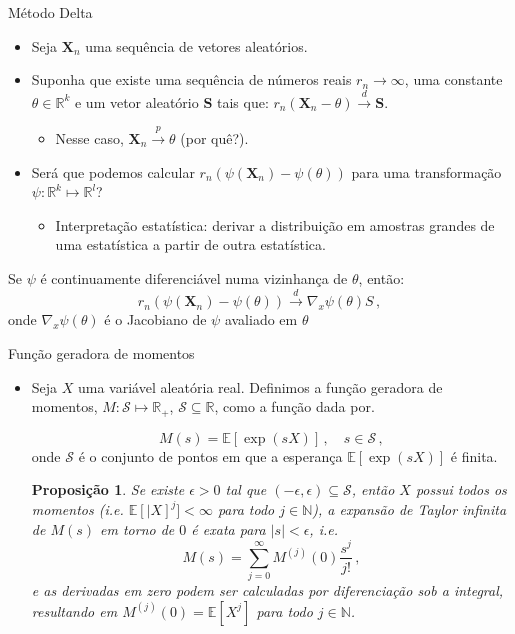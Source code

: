 \documentclass[11pt]{beamer}
\newtheorem{proposition}{Proposição}
\begin{document}
	\begin{frame}{Método Delta}

	\begin{itemize}
		\item Seja $\boldsymbol{X}_n$ uma sequência de vetores aleatórios. 
		\item Suponha que existe uma sequência de números reais $r_n \to \infty$, uma constante $\theta \in \mathbb{R}^k$ e um vetor aleatório $\boldsymbol{S}$ tais que: $r_n(\boldsymbol{X}_n-\theta) \overset{d}{\to}\boldsymbol{S}$.
		\begin{itemize}
			\item Nesse caso, $\boldsymbol{X}_n \overset{p}{\to} \theta$ (por quê?).
		\end{itemize}
		\item Será que podemos calcular $r_n(\psi(\boldsymbol{X}_n)-\psi(\theta))$ para uma transformação $\psi:\mathbb{R}^k \mapsto \mathbb{R}^l$?
		\begin{itemize}
			\item Interpretação estatística: derivar a distribuição em amostras grandes de uma estatística a partir de outra estatística.
		\end{itemize}
	\end{itemize}
	\begin{lemma}
	Se $\psi$ é continuamente diferenciável numa vizinhança de $\theta$, então:
	$$r_n(\psi(\boldsymbol{X}_n)-\psi(\theta)) \overset{d}{\to} \nabla_{x}\psi(\theta) S\, ,$$
	onde $\nabla_{x}\psi(\theta)$ é o Jacobiano de $\psi$ avaliado em $\theta$
	\end{lemma}
	\end{frame}
	\begin{frame}{Função geradora de momentos}
		\begin{itemize}
			\item Seja $X$ uma variável aleatória real. Definimos a função geradora de momentos, $M: \mathcal{S} \mapsto \mathbb{R}_+$, $\mathcal{S}\subseteq \mathbb{R}$, como a função dada por.
			
			$$M(s) = \mathbb{E}[\exp(sX)]\, ,\quad  s \in \mathcal{S}\, ,$$
			onde  $\mathcal{S}$ é o conjunto de pontos em que a esperança $ \mathbb{E}[\exp(sX)]$ é finita.

			
			\begin{proposition}
				Se existe $\epsilon > 0$ tal que $(-\epsilon,\epsilon)\subseteq\mathcal{S}$, então $X$ possui todos os momentos (i.e. $\mathbb{E}[|X]^j] < \infty$ para todo $j \in \mathbb{N}$), a expansão de Taylor infinita de $M(s)$ em torno de $0$ é exata para $|s|<\epsilon$, i.e.
				$$M(s) = \sum_{j=0}^\infty  M^{(j)}(0) \frac{s^j}{j!} \,,$$
				e as derivadas em zero podem ser calculadas por diferenciação sob a integral, resultando em $M^{(j)}(0) = \mathbb{E}[X^j]$ para todo $j \in \mathbb{N}$.
			\end{proposition}
		\end{itemize}
	\end{frame}
\end{document}

